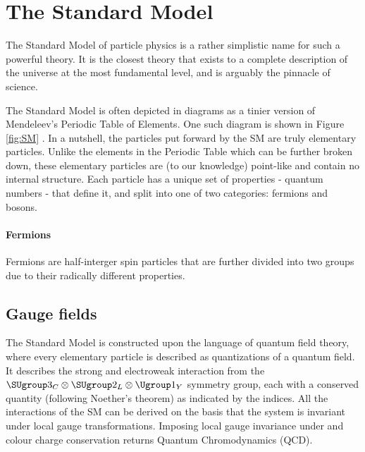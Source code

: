 
\chapter{The Standard Model}
\label{chap:theory}

The Standard Model of particle physics is a rather simplistic name for such a powerful theory. It is the closest theory that exists to a complete description of the universe at the most fundamental level, and is arguably the pinnacle of science. 

The Standard Model is often depicted in diagrams as a tinier version of Mendeleev's Periodic Table of Elements. One such diagram is shown in Figure \ref{fig:SM} . In a nutshell, the particles put forward by the SM are truly elementary particles. Unlike the elements in the Periodic Table which can be further broken down, these elementary particles are (to our knowledge) point-like and contain no internal structure. Each particle has a unique set of properties - quantum numbers - that define it, and split into one of two categories: fermions and bosons. 

\subsubsection{Fermions}

Fermions are half-interger spin particles that are further divided into two groups due to their radically different properties. 

\section{Gauge fields}

The Standard Model is constructed upon the language of quantum field theory, where every elementary particle is described as quantizations  of a quantum field. It describes the strong and electroweak interaction from the $\SUgroup3_C\otimes\SUgroup2_L\otimes\Ugroup1_Y$ symmetry group, each with a conserved quantity (following Noether's theorem) as indicated by the indices. All the interactions of the SM can be derived on the basis that the system is invariant under local gauge transformations. Imposing local gauge invariance under  and colour charge conservation returns Quantum Chromodynamics (QCD). 

